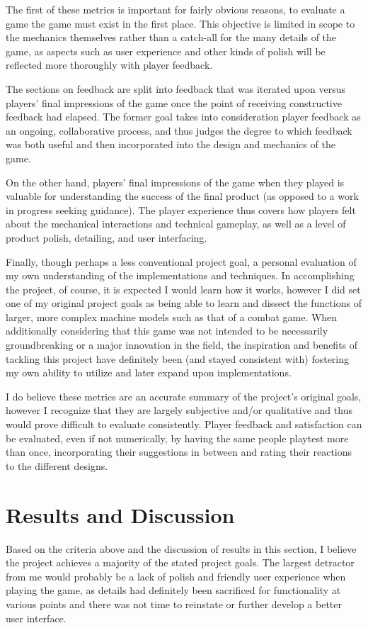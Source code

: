 \documentclass[10pt,twocolumn]{article}
\begin{document}
The first of these metrics is important for fairly obvious reasons, to evaluate a game the game must exist in the first place. This objective is limited in scope to the mechanics themselves rather than a catch-all for the many details of the game, as aspects such as user experience and other kinds of polish will be reflected more thoroughly with player feedback. 

The sections on feedback are split into feedback that was iterated upon versus players' final impressions of the game once the point of receiving constructive feedback had elapsed. The former goal takes into consideration player feedback as an ongoing, collaborative process, and thus judges the degree to which feedback was both useful and then incorporated into the design and mechanics of the game. 

On the other hand, players' final impressions of the game when they played is valuable for understanding the success of the final product (as opposed to a work in progress seeking guidance). The player experience thus covers how players felt about the mechanical interactions and technical gameplay, as well as a level of product polish, detailing, and user interfacing. 

Finally, though perhaps a less conventional project goal, a personal evaluation of my own understanding of the implementations and techniques. In accomplishing the project, of course, it is expected I would learn how it works, however I did set one of my original project goals as being able to learn and dissect the functions of larger, more complex machine models such as that of a combat game. When additionally considering that this game was not intended to be necessarily groundbreaking or a major innovation in the field, the inspiration and benefits of tackling this project have definitely been (and stayed consistent with) fostering my own ability to utilize and later expand upon implementations.

I do believe these metrics are an accurate summary of the project's original goals, however I recognize that they are largely subjective and/or qualitative and thus would prove difficult to evaluate consistently. Player feedback and satisfaction can be evaluated, even if not numerically, by having the same people playtest more than once, incorporating their suggestions in between and rating their reactions to the different designs. 

\section {Results and Discussion}
Based on the criteria above and the discussion of results in this section, I believe the project achieves a majority of the stated project goals. The largest detractor from me would probably be a lack of polish and friendly user experience when playing the game, as details had definitely been sacrificed for functionality at various points and there was not time to reinstate or further develop a better user interface.
\end{document}
